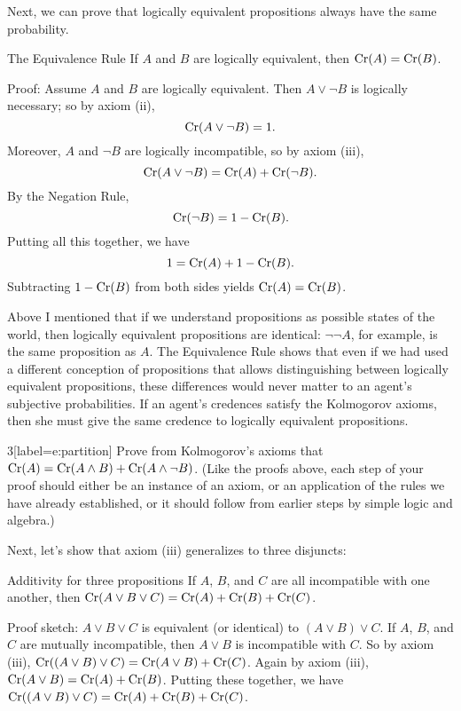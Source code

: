 Next, we can prove that logically equivalent propositions always have
the same probability.

\begin{genericthm}{The Equivalence Rule}
  If $A$ and $B$ are logically equivalent, then $\text{Cr}(A) = \text{Cr}(B)$.
\end{genericthm}
Proof: Assume $A$ and $B$ are logically equivalent. Then $A \lor \neg
B$ is logically necessary; so by axiom (ii),
\[
  \text{Cr}(A \lor \neg B) = 1.
\]
Moreover, $A$ and $\neg B$ are logically incompatible, so by axiom
(iii),
\[
  \text{Cr}(A \lor \neg B) = \text{Cr}(A) + \text{Cr}(\neg B).
\]
By the Negation Rule,
\[
  \text{Cr}(\neg B) = 1-\text{Cr}(B).
\]
Putting all this together, we have
\[
  1 = \text{Cr}(A) + 1 - \text{Cr}(B).
\]
Subtracting $1-\text{Cr}(B)$ from both sides yields $\text{Cr}(A) = \text{Cr}(B)$.

Above I mentioned that if we understand propositions as possible
states of the world, then logically equivalent propositions are
identical: $\neg\neg A$, for example, is the same proposition as
$A$. The Equivalence Rule shows that even if we had used a different
conception of propositions that allows distinguishing between
logically equivalent propositions, these differences would never
matter to an agent's subjective probabilities. If an agent's credences
satisfy the Kolmogorov axioms, then she must give the same credence to
logically equivalent propositions.

\begin{exercise}{3}[label=e:partition]
  Prove from Kolmogorov's axioms that
  $\text{Cr}(A) = \text{Cr}(A\land B) + \text{Cr}(A \land \neg B)$. (Like the proofs
  above, each step of your proof should either be an instance of an
  axiom, or an application of the rules we have already established,
  or it should follow from earlier steps by simple logic and algebra.)
\end{exercise}

Next, let's show that axiom (iii) generalizes to three disjuncts:

\begin{genericthm}{Additivity for three propositions}
  If $A$, $B$, and $C$ are all incompatible with one another, then
  $\text{Cr}(A \lor B \lor C) = \text{Cr}(A) + \text{Cr}(B) + \text{Cr}(C)$.
\end{genericthm}
Proof sketch: $A \lor B \lor C$ is equivalent (or identical) to
$(A \lor B) \lor C$. If $A$, $B$, and $C$ are mutually incompatible,
then $A \lor B$ is incompatible with $C$. So by axiom (iii),
$\text{Cr}((A \lor B) \lor C) = \text{Cr}(A \lor B) + \text{Cr}(C)$. Again by axiom
(iii), $\text{Cr}(A \lor B) = \text{Cr}(A) + \text{Cr}(B)$. Putting these together, we
have $\text{Cr}((A \lor B) \lor C) = \text{Cr}(A) + \text{Cr}(B) + \text{Cr}(C)$.

